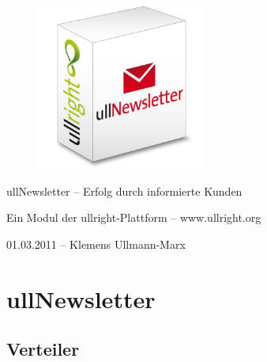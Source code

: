 \documentclass[article, a4paper, oneside, 11pt]{memoir}
\begin{document}
\vspace*{3cm}
\begin{figure}[htp]
\centering
\includegraphics[width=0.5\textwidth]{softwarebox}
\end{figure}

\vspace{3cm}

{%
\huge
\color{ullblue}
ullNewsletter -- Erfolg durch informierte Kunden
}

\vspace{0.2cm}

{%
\large
Ein Modul der ullright-Plattform -- www.ullright.org
}

\vspace{1cm}

{%
\footnotesize
01.03.2011 -- Klemens Ullmann-Marx
}

\clearpage

\pagestyle{plain}


\setcounter{secnumdepth}{2}
\setcounter{tocdepth}{2}
\tableofcontents*

\clearpage

\addtocounter{chapter}{1}

\chapter*{ullNewsletter}

\section{Verteiler}
\end{document}
